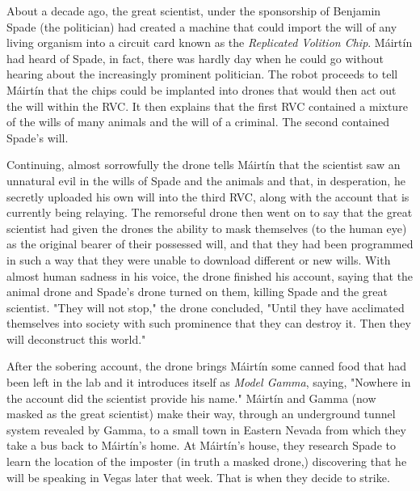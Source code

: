 \documentclass[12pt]{article}
\newcommand{\mc}{M\'airt\'in}
\newcommand{\mcs}{M\'airt\'in }
\begin{document}
\begin{flushleft}
About a decade ago, the great scientist, under the sponsorship of Benjamin Spade (the politician) had created a machine
that could import the will of any living organism into a circuit card known as the \emph{Replicated Volition Chip}.
\mcs had heard of Spade, in fact, there was hardly day when he could go without hearing about the increasingly
prominent politician. The robot proceeds to tell \mcs that the chips could be implanted into drones that would then act out
the will within the RVC. It then explains that the first RVC contained a mixture of the wills of many animals and the will of 
a criminal. The second contained Spade's
will.

Continuing, almost sorrowfully the drone tells \mcs that the scientist saw an unnatural evil in the wills of Spade and the
animals and that, in desperation, he secretly uploaded his own will into the third RVC, along with the account that
is currently being relaying. The remorseful drone then went on to say that the great scientist had given the drones the ability
to mask themselves (to the human eye) as the original bearer of their possessed will, and that they had been programmed in such a way that they
were unable to download different or new wills. With almost human sadness in his voice, the drone
finished his account, saying that the animal drone and Spade's drone turned on them, killing Spade and the great scientist.
"They will not stop," the drone concluded, "Until they have acclimated themselves into society with such prominence that
they can destroy it. Then they will deconstruct this world."

After the sobering account, the drone brings \mcs some canned food that had been left in the lab and it introduces itself
as \emph{Model Gamma}, saying, "Nowhere in the account did the scientist provide his name." \mcs and
Gamma (now masked as the great scientist) make their way, through an underground tunnel system revealed by Gamma, to
a small town in Eastern Nevada from which they take a bus back to \mc's home. At \mc's house, they research Spade to
learn the location of the imposter (in truth a masked drone,)
discovering that he will be speaking in Vegas later that week. That is when they decide to strike.


\end{flushleft}
\end{document}
